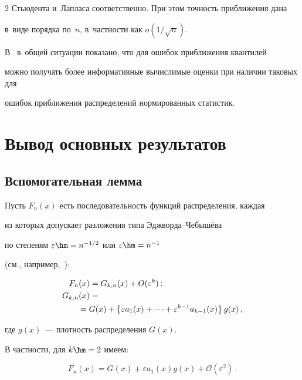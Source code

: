 \begin{multicols}{2}
Стьюдента и~Лапласа соответственно. При этом точность приближения  дана 

в~виде порядка по~$n$, в~частности как $o(1/\sqrt{n}).$ 

В~\cite{Arx2016} в~общей ситуации показано, что для ошибок приближения квантилей 

можно получать более информативные вы\-чис\-ли\-мые оценки при наличии таковых для 

ошибок приближения распределений  нормированных статистик.



\section{Вывод основных результатов}



\subsection{Вспомогательная лемма}



Пусть $F_{n}(x)$ есть последовательность функций распределения, каждая 

из которых допускает разложения типа Эдж\-вор\-да--Че\-бы\-шё\-ва 

по степеням $\varepsilon\hm=n^{-1/2}$ или $\varepsilon\hm=n^{-1}$ 

(см., например,~\cite{EncStat}):

\begin{align*}

F_n(x)&=G_{k,n}(x)+O(\varepsilon^k)\,; \\

G_{k,n}(x)&={}\\

&\hspace*{-5mm}{}= G(x)+\left\{\varepsilon a_{1}(x)+\cdots+\varepsilon^{k-1}a_{k-1}(x)\right\}

g(x)\,, 

\end{align*}

где $g(x)$~--- плотность распределения $G(x)$.



 В частности, для $k\hm=2$ имеем: 

\begin{equation}

\label{f1}

F_n(x)=G(x)+\varepsilon a_{1}(x)g(x) +\mathcal{O}\left(\varepsilon^{2}\right)\,.


\end{equation}
\end{multicols}
